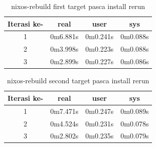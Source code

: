 \documentclass[10pt,]{report}
\begin{document}
\begin{adjustwidth}{20pt}{}
\begin{adjustwidth}{20pt}{}
	\end{adjustwidth}
	\begin{table}[H]
		\caption{nixos-rebuild first target pasca install rerun}
		\begin{center}
			\begin{tabular}[c]{|c|c|c|c|}
				\hline
				\multicolumn{1}{|c|}{\textbf{Iterasi ke-}} &
				\multicolumn{1}{c|}{\textbf{real}}         &
				\multicolumn{1}{c|}{\textbf{user}}         &
				\multicolumn{1}{c|}{\textbf{sys}}                                           \\
				\hline
				1                                          & 0m6.881s & 0m0.241s & 0m0.088s \\
				\hline
				2                                          & 0m3.998s & 0m0.223s & 0m0.088s \\
				\hline
				3                                          & 0m2.899s & 0m0.227s & 0m0.086s \\
				\hline
			\end{tabular}
		\end{center}
	\end{table}
	\vspace{-5mm}
	\begin{table}[H]
		\caption{nixos-rebuild second target pasca install rerun}
		\begin{center}
			\begin{tabular}[c]{|c|c|c|c|}
				\hline
				\multicolumn{1}{|c|}{\textbf{Iterasi ke-}} &
				\multicolumn{1}{c|}{\textbf{real}}         &
				\multicolumn{1}{c|}{\textbf{user}}         &
				\multicolumn{1}{c|}{\textbf{sys}}                                           \\
				\hline
				1                                          & 0m7.471s & 0m0.247s & 0m0.089s \\
				\hline
				2                                          & 0m4.524s & 0m0.231s & 0m0.078s \\
				\hline
				3                                          & 0m2.802s & 0m0.235s & 0m0.079s \\
				\hline
			\end{tabular}
		\end{center}
	\end{table}

\end{adjustwidth}
\end{document}
